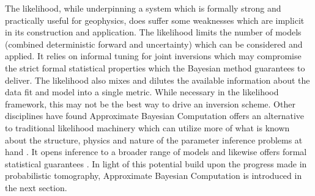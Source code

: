 

The likelihood, while underpinning a system which is formally strong and practically useful for geophysics, does suffer some weaknesses which are implicit in its construction and application. The likelihood limits the number of models (combined deterministic forward and uncertainty) which can be considered and applied. It relies on informal tuning for joint inversions which may compromise the strict formal statistical properties which the Bayesian method guarantees to deliver. The likelihood also mixes and dilutes the available information about the data fit and model into a single metric. While necessary in the likelihood framework, this may not be the best way to drive an inversion scheme. Other disciplines have found Approximate Bayesian Computation offers an alternative to traditional likelihood machinery which can utilize more of what is known about the structure, physics and nature of the parameter inference problems at hand \citep{Tavare1997,Ratmann2009,vrugt2013toward}. It opens inference to a broader range of models and likewise offers formal statistical guarantees \citep{Sunnaker2013}. In light of this potential build upon the progress made in probabilistic tomography, Approximate Bayesian Computation is introduced in the next section. \\

